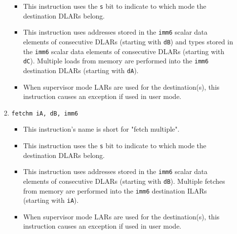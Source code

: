 \documentclass{article}
\begin{document}
\begin{itemize}
\begin{enumerate}
\begin{itemize}
				\item This instruction uses the \texttt{s} bit to indicate
				to which mode the destination DLARs belong.

				\item This instruction uses addresses stored in the
				\texttt{imm6} scalar data elements of consecutive DLARs
				(starting with \texttt{dB}) and types stored in the
				\texttt{imm6} scalar data elements of consecutive DLARs
				(starting with \texttt{dC}).  Multiple loads from memory
				are performed into the \texttt{imm6} destination DLARs
				(starting with \texttt{dA}).

				\item When supervisor mode LARs are used for the
				destination(s), this instruction causes an exception if
				used in user mode.
				\end{itemize}

			\item \texttt{fetchm iA, dB, imm6}
				\begin{itemize}
				\item This instruction's name is short for "fetch
				multiple".

				\item This instruction uses the \texttt{s} bit to indicate
				to which mode the destination DLARs belong.

				\item This instruction uses addresses stored in the
				\texttt{imm6} scalar data elements of consecutive DLARs
				(starting with \texttt{dB}).  Multiple fetches from memory
				are performed into the \texttt{imm6} destination ILARs
				(starting with \texttt{iA}).

				\item When supervisor mode LARs are used for the
				destination(s), this instruction causes an exception if
				used in user mode.
				\end{itemize}
			\end{enumerate}
		\end{itemize}



\end{document}
